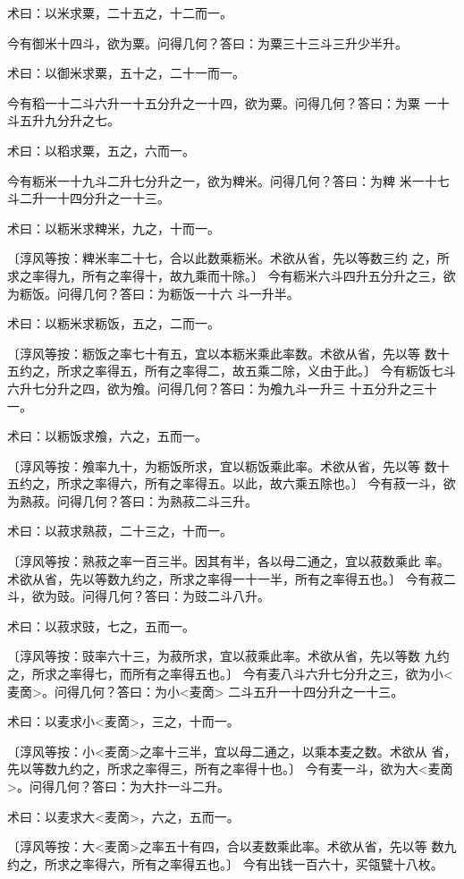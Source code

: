 \documentclass[12pt,UTF8]{ctexbook}
\begin{document}
术曰：以米求粟，二十五之，十二而一。

今有御米十四斗，欲为粟。问得几何？答曰：为粟三十三斗三升少半升。

术曰：以御米求粟，五十之，二十一而一。

今有稻一十二斗六升一十五分升之一十四，欲为粟。问得几何？答曰：为粟 一十斗五升九分升之七。

术曰：以稻求粟，五之，六而一。

今有粝米一十九斗二升七分升之一，欲为粺米。问得几何？答曰：为粺 米一十七斗二升一十四分升之一十三。

术曰：以粝米求粺米，九之，十而一。

〔淳风等按：粺米率二十七，合以此数乘粝米。术欲从省，先以等数三约 之，所求之率得九，所有之率得十，故九乘而十除。〕 今有粝米六斗四升五分升之三，欲为粝饭。问得几何？答曰：为粝饭一十六 斗一升半。

术曰：以粝米求粝饭，五之，二而一。

〔淳风等按：粝饭之率七十有五，宜以本粝米乘此率数。术欲从省，先以等 数十五约之，所求之率得五，所有之率得二，故五乘二除，义由于此。〕 今有粝饭七斗六升七分升之四，欲为飧。问得几何？答曰：为飧九斗一升三 十五分升之三十一。

术曰：以粝饭求飧，六之，五而一。

〔淳风等按：飧率九十，为粝饭所求，宜以粝饭乘此率。术欲从省，先以等 数十五约之，所求之率得六，所有之率得五。以此，故六乘五除也。〕 今有菽一斗，欲为熟菽。问得几何？答曰：为熟菽二斗三升。

术曰：以菽求熟菽，二十三之，十而一。

〔淳风等按：熟菽之率一百三半。因其有半，各以母二通之，宜以菽数乘此 率。术欲从省，先以等数九约之，所求之率得一十一半，所有之率得五也。〕 今有菽二斗，欲为豉。问得几何？答曰：为豉二斗八升。

术曰：以菽求豉，七之，五而一。

〔淳风等按：豉率六十三，为菽所求，宜以菽乘此率。术欲从省，先以等数 九约之，所求之率得七，而所有之率得五也。〕 今有麦八斗六升七分升之三，欲为小<麦啇>。问得几何？答曰：为小<麦啇> 二斗五升一十四分升之一十三。

术曰：以麦求小<麦啇>，三之，十而一。

〔淳风等按：小<麦啇>之率十三半，宜以母二通之，以乘本麦之数。术欲从 省，先以等数九约之，所求之率得三，所有之率得十也。〕 今有麦一斗，欲为大<麦啇>。问得几何？答曰：为大抃一斗二升。

术曰：以麦求大<麦啇>，六之，五而一。

〔淳风等按：大<麦啇>之率五十有四，合以麦数乘此率。术欲从省，先以等 数九约之，所求之率得六，所有之率得五也。〕 今有出钱一百六十，买瓴甓十八枚。
\end{document}
